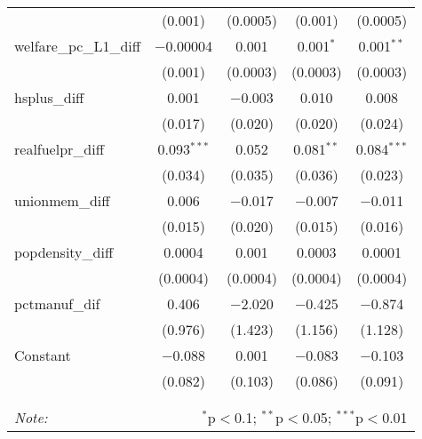 \begin{table}[!htbp]
\begin{tabular}{@{\extracolsep{5pt}}lcccc}
  & (0.001) & (0.0005) & (0.001) & (0.0005) \\ 
  welfare\_pc\_L1\_diff & $-$0.00004 & 0.001 & 0.001$^{*}$ & 0.001$^{**}$ \\ 
  & (0.001) & (0.0003) & (0.0003) & (0.0003) \\ 
  hsplus\_diff & 0.001 & $-$0.003 & 0.010 & 0.008 \\ 
  & (0.017) & (0.020) & (0.020) & (0.024) \\ 
  realfuelpr\_diff & 0.093$^{***}$ & 0.052 & 0.081$^{**}$ & 0.084$^{***}$ \\ 
  & (0.034) & (0.035) & (0.036) & (0.023) \\ 
  unionmem\_diff & 0.006 & $-$0.017 & $-$0.007 & $-$0.011 \\ 
  & (0.015) & (0.020) & (0.015) & (0.016) \\ 
  popdensity\_diff & 0.0004 & 0.001 & 0.0003 & 0.0001 \\ 
  & (0.0004) & (0.0004) & (0.0004) & (0.0004) \\ 
  pctmanuf\_dif & 0.406 & $-$2.020 & $-$0.425 & $-$0.874 \\ 
  & (0.976) & (1.423) & (1.156) & (1.128) \\ 
  Constant & $-$0.088 & 0.001 & $-$0.083 & $-$0.103 \\ 
  & (0.082) & (0.103) & (0.086) & (0.091) \\ 
 \hline \\[-1.8ex] 
\hline 
\hline \\[-1.8ex] 
\textit{Note:}  & \multicolumn{4}{r}{$^{*}$p$<$0.1; $^{**}$p$<$0.05; $^{***}$p$<$0.01} \\ 
\end{tabular} 
\end{table} 
